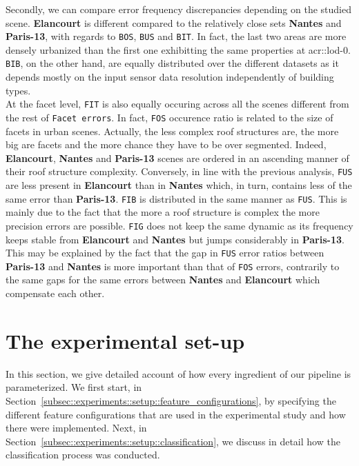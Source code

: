         Secondly, we can compare error frequency discrepancies depending on the studied scene.
        \textbf{Elancourt} is different compared to the relatively close sets \textbf{Nantes} and \textbf{Paris-13}, with regards to \texttt{BOS}, \texttt{BUS} and \texttt{BIT}.
        In fact, the last two areas are more densely urbanized than the first one exhibitting the same properties at \gls{acr::lod}-0.
        \texttt{BIB}, on the other hand, are equally distributed over the different datasets as it depends mostly on the input sensor data resolution independently of building types.\\
        At the facet level, \texttt{FIT} is also equally occuring across all the scenes different from the rest of \texttt{Facet errors}.
        In fact, \texttt{FOS} occurence ratio is related to the size of facets in urban scenes.
        Actually, the less complex roof structures are, the more big are facets and the more chance they have to be over segmented.
        Indeed, \textbf{Elancourt}, \textbf{Nantes} and \textbf{Paris-13} scenes are ordered in an ascending manner of their roof structure complexity.
        Conversely, in line with the previous analysis, \texttt{FUS} are less present in \textbf{Elancourt} than in \textbf{Nantes} which, in turn, contains less of the same error than \textbf{Paris-13}.
        \texttt{FIB} is distributed in the same manner as \texttt{FUS}.
        This is mainly due to the fact that the more a roof structure is complex the more precision errors are possible.
        \texttt{FIG} does not keep the same dynamic as its frequency keeps stable from \textbf{Elancourt} and \textbf{Nantes} but jumps considerably in \textbf{Paris-13}.
        This may be explained by the fact that the gap in \texttt{FUS} error ratios between \textbf{Paris-13} and \textbf{Nantes} is more important than that of \texttt{FOS} errors, contrarily to the same gaps for the same errors between \textbf{Nantes} and \textbf{Elancourt} which compensate each other.

\section{The experimental set-up}
    \label{sec::experiments::setup}
    In this section, we give detailed account of how every ingredient of our pipeline is parameterized.
    We first start, in Section~\ref{subsec::experiments::setup::feature_configurations}, by specifying the different feature configurations that are used in the experimental study and how there were implemented.
    Next, in Section~\ref{subsec::experiments::setup::classification}, we discuss in detail how the classification process was conducted.

